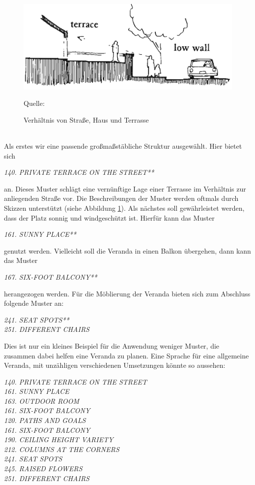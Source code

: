 \documentclass[fontsize=11pt,a4paper,final]{scrreprt}[2003/01/01]
\newcommand*{\quelle}{%
	\footnotesize Quelle: 
}
\begin{document}
\begin{figure}[H]
	\centering
	\includegraphics[width=0.8\linewidth]{Bilder/Terasse.png}
	\caption{Verhältnis von Straße, Haus und Terrasse}
	\quelle{ \cite[S. 667]{Alexander1977}}
	\label{fig:Terasse}
\end{figure} \ \\
Als erstes wir eine passende großmaßstäbliche Struktur ausgewählt. Hier bietet sich 
\begin{center}
	\textit{140. PRIVATE TERRACE ON THE STREET**}
\end{center} an. Dieses Muster schlägt eine vernünftige Lage einer Terrasse im Verhältnis zur anliegenden Straße vor. Die Beschreibungen der Muster werden oftmals durch Skizzen unterstützt (siehe Abbildung \ref{fig:Terasse}). Als nächstes soll gewährleistet werden, dass der Platz sonnig und windgeschützt ist. Hierfür kann das Muster
\begin{center}
	\textit{161. SUNNY PLACE**}
\end{center}
genutzt werden. Vielleicht soll die Veranda in einen Balkon übergehen, dann kann das Muster
\begin{center}
	\textit{167. SIX-FOOT BALCONY**}
\end{center}
herangezogen werden. Für die Möblierung der Veranda bieten sich zum Abschluss folgende Muster an:
\begin{center}
	\textit{241. SEAT SPOTS**} \\
	\textit{251. DIFFERENT CHAIRS}	
\end{center}
Dies ist nur ein kleines Beispiel für die Anwendung weniger Muster, die zusammen dabei helfen eine Veranda zu planen. Eine Sprache für eine allgemeine Veranda, mit unzähligen verschiedenen Umsetzungen könnte so aussehen: 
\begin{center}
\textit{140. PRIVATE TERRACE ON THE STREET} \\
\textit{161. SUNNY PLACE} \\
\textit{163. OUTDOOR ROOM} \\
\textit{161. SIX-FOOT BALCONY} \\
\textit{120. PATHS AND GOALS} \\
\textit{161. SIX-FOOT BALCONY} \\
\textit{190. CEILING HEIGHT VARIETY} \\
\textit{212. COLUMNS AT THE CORNERS} \\
\textit{241. SEAT SPOTS} \\
\textit{245. RAISED FLOWERS} \\
\textit{251. DIFFERENT CHAIRS}
\end{center}
\end{document}
